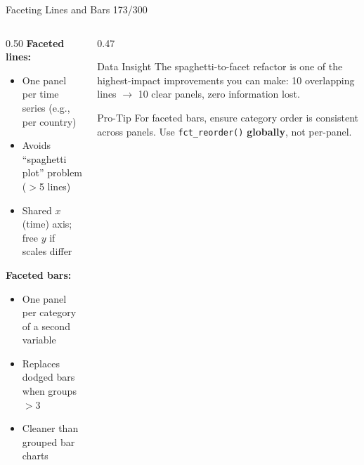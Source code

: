 \documentclass[10pt]{beamer}
\newcommand{\smark}[1]{\hfill{\scriptsize\color{codegray}#1}}
\begin{document}
\begin{frame}{Faceting Lines and Bars}
\smark{173/300}
\begin{columns}[T]
\begin{column}{0.50\textwidth}
    \textbf{Faceted lines:}
    \begin{itemize}
        \item One panel per time series (e.g., per country)
        \item Avoids ``spaghetti plot'' problem ($>$5 lines)
        \item Shared $x$ (time) axis; free $y$ if scales differ
    \end{itemize}
    \vspace{0.2cm}
    \textbf{Faceted bars:}
    \begin{itemize}
        \item One panel per category of a second variable
        \item Replaces dodged bars when groups $>$3
        \item Cleaner than grouped bar charts
    \end{itemize}
\end{column}
\begin{column}{0.47\textwidth}
\begin{exampleblock}{Data Insight}
    \scriptsize The spaghetti-to-facet refactor is one of the highest-impact improvements you can make: 10 overlapping lines $\to$ 10 clear panels, zero information lost.
\end{exampleblock}
\vspace{0.2cm}
\begin{alertblock}{Pro-Tip}
    \scriptsize For faceted bars, ensure category order is consistent across panels. Use \texttt{fct\_reorder()} \textbf{globally}, not per-panel.
\end{alertblock}
\end{column}
\end{columns}
\end{frame}
\end{document}
